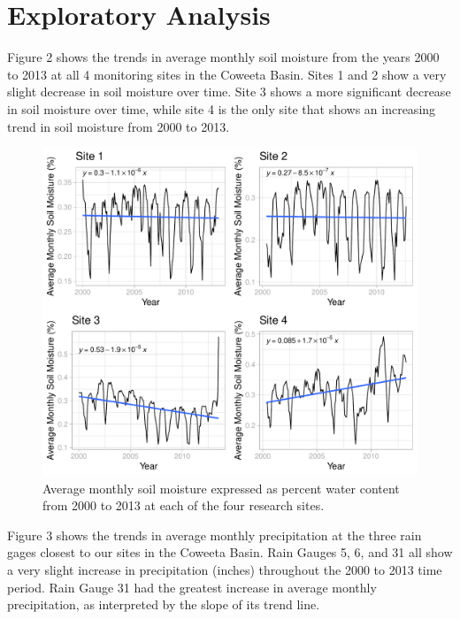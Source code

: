 \documentclass[
  12pt,
]{article}
\begin{document}
\newpage

\hypertarget{exploratory-analysis}{%
\section{Exploratory Analysis}\label{exploratory-analysis}}

Figure 2 shows the trends in average monthly soil moisture from the
years 2000 to 2013 at all 4 monitoring sites in the Coweeta Basin. Sites
1 and 2 show a very slight decrease in soil moisture over time. Site 3
shows a more significant decrease in soil moisture over time, while site
4 is the only site that shows an increasing trend in soil moisture from
2000 to 2013.

\begin{figure}
\centering
\includegraphics{Project_Template_files/figure-latex/Average Monthly Soil Moisture Cowplot-1.pdf}
\caption{Average monthly soil moisture expressed as percent water
content from 2000 to 2013 at each of the four research sites.}
\end{figure}

\newpage

Figure 3 shows the trends in average monthly precipitation at the three
rain gages closest to our sites in the Coweeta Basin. Rain Gauges 5, 6,
and 31 all show a very slight increase in precipitation (inches)
throughout the 2000 to 2013 time period. Rain Gauge 31 had the greatest
increase in average monthly precipitation, as interpreted by the slope
of its trend line.
\end{document}
